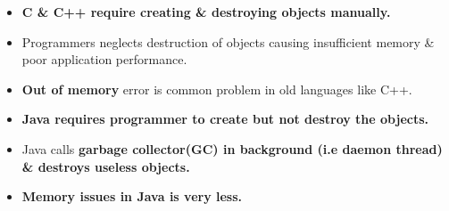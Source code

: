 \setlength{\columnsep}{3pt}
\begin{flushleft}
	
	\begin{itemize}
		\item \textbf{C \& C++ require creating \& destroying objects manually.}
		\item Programmers neglects destruction of objects causing insufficient memory \& poor application performance.
		\item \textbf{Out of memory} error is common problem in old languages like C++.
		\item \textbf{Java requires programmer to create but not destroy the objects.}
		\item Java calls \textbf{garbage collector(GC) in background (i.e daemon thread) \& destroys useless objects.}
		\item \textbf{Memory issues in Java is very less.}
	\end{itemize}
	
\end{flushleft}
\newpage
